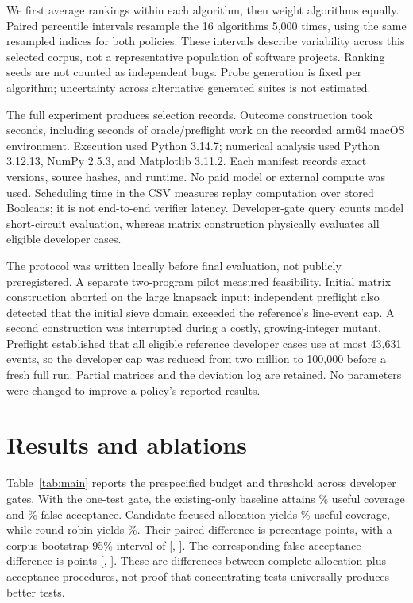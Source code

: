 \documentclass[10pt]{article}
\begin{document}
We first average rankings within each algorithm, then weight algorithms equally. Paired percentile intervals resample the 16 algorithms 5,000 times, using the same resampled indices for both policies. These intervals describe variability across this selected corpus, not a representative population of software projects. Ranking seeds are not counted as independent bugs. Probe generation is fixed per algorithm; uncertainty across alternative generated suites is not estimated.

The full experiment produces \SelectionCount{} selection records. Outcome construction took \MatrixSeconds{} seconds, including \OracleSeconds{} seconds of oracle/preflight work on the recorded arm64 macOS environment. Execution used Python 3.14.7; numerical analysis used Python 3.12.13, NumPy 2.5.3, and Matplotlib 3.11.2. Each manifest records exact versions, source hashes, and runtime. No paid model or external compute was used. Scheduling time in the CSV measures replay computation over stored Booleans; it is not end-to-end verifier latency. Developer-gate query counts model short-circuit evaluation, whereas matrix construction physically evaluates all eligible developer cases.

The protocol was written locally before final evaluation, not publicly preregistered. A separate two-program pilot measured feasibility. Initial matrix construction aborted on the large knapsack input; independent preflight also detected that the initial sieve domain exceeded the reference's line-event cap. A second construction was interrupted during a costly, growing-integer mutant. Preflight established that all eligible reference developer cases use at most 43,631 events, so the developer cap was reduced from two million to 100,000 before a fresh full run. Partial matrices and the deviation log are retained. No parameters were changed to improve a policy's reported results.

\section{Results and ablations}
Table~\ref{tab:main} reports the prespecified budget and threshold across developer gates. With the one-test gate, the existing-only baseline attains \ExistingUseful\% useful coverage and \ExistingFalse\% false acceptance. Candidate-focused allocation yields \FocusedUseful\% useful coverage, while round robin yields \RoundRobinUseful\%. Their paired difference is \DeltaUseful{} percentage points, with a corpus bootstrap 95\% interval of [\DeltaUsefulLo, \DeltaUsefulHi]. The corresponding false-acceptance difference is \DeltaFalse{} points [\DeltaFalseLo, \DeltaFalseHi]. These are differences between complete allocation-plus-acceptance procedures, not proof that concentrating tests universally produces better tests.
\end{document}

